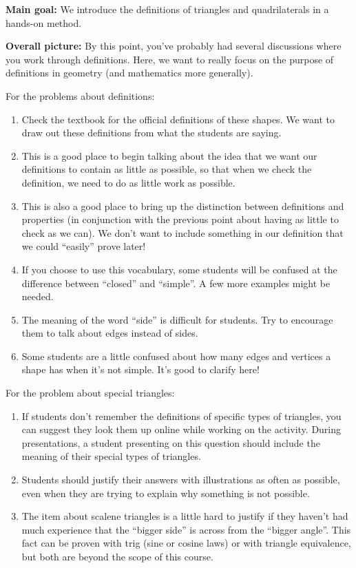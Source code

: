\documentclass[nooutcomes,noauthor]{ximera}
\begin{document}
\pagebreak
\begin{instructorNotes}

{\bf Main goal:} We  introduce the definitions of triangles and quadrilaterals in a hands-on method.

{\bf Overall picture:} By this point, you've probably had several discussions where you work through definitions.  Here, we want to really focus on the purpose of definitions in geometry (and mathematics more generally).




For the problems about definitions:
\begin{enumerate}
\item Check the textbook for the official definitions of these shapes. We want to draw out these definitions from what the students are saying.
\item This is a good place to begin talking about the idea that we want our definitions to contain as little as possible, so that when we check the definition, we need to do as little work as possible.
\item This is also a good place to bring up the distinction between definitions and properties (in conjunction with the previous point about having as little to check as we can). We don't want to include something in our definition that we could ``easily'' prove later!
\item If you choose to use this vocabulary, some students will be confused at the difference between ``closed'' and ``simple''.  A few more examples might be needed.
\item The meaning of the word ``side'' is difficult for students.  Try to encourage them to talk about edges instead of sides.  
\item Some students are a little confused about how many edges and vertices a shape has when it's not simple.  It's good to clarify here!
\end{enumerate}


For the problem about special triangles:
\begin{enumerate}
\item If students don't remember the definitions of specific types of triangles, you can suggest they look them up online while working on the activity.  During presentations, a student presenting on this question should include the meaning of their special types of triangles.
\item Students should justify their answers with illustrations as often as possible, even when they are trying to explain why something is not possible.
\item The item about scalene triangles is a little hard to justify if they haven't had much experience that the ``bigger side'' is across from the ``bigger angle''.  This fact can be proven with trig (sine or cosine laws) or with triangle equivalence, but both are beyond the scope of this course.
\end{enumerate}


\end{instructorNotes}
\end{document}
